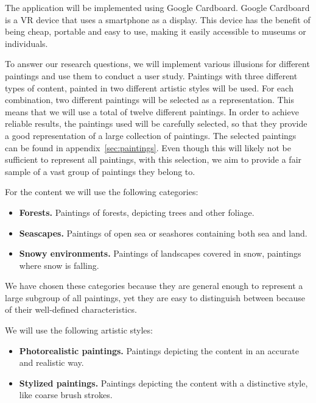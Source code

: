 \documentclass[a4paper]{article}
\begin{document}
The application will be implemented using Google Cardboard. Google Cardboard is a VR device that uses a smartphone as a display. This device has the benefit of being cheap, portable and easy to use, making it easily accessible to museums or individuals.

To answer our research questions, we will implement various illusions for different paintings and use them to conduct a user study. Paintings with three different types of content, painted in two different artistic styles will be used. For each combination, two different paintings will be selected as a representation. This means that we will use a total of twelve different paintings. In order to achieve reliable results, the paintings used will be carefully selected, so that they provide a good representation of a large collection of paintings. The selected paintings can be found in appendix~\ref{sec:paintings}. Even though this will likely not be sufficient to represent all paintings, with this selection, we aim to provide a fair sample of a vast group of paintings they belong to.

For the content we will use the following categories:

\begin{itemize}
\item \textbf{Forests.} Paintings of forests, depicting trees and other foliage.
\item \textbf{Seascapes.} Paintings of open sea or seashores containing both sea and land.
\item \textbf{Snowy environments.} Paintings of landscapes covered in snow, paintings where snow is falling.
\end{itemize}

We have chosen these categories because they are general enough to represent a large subgroup of all paintings, yet they are easy to distinguish between because of their well-defined characteristics.

We will use the following artistic styles:

\begin{itemize}
\item \textbf{Photorealistic paintings.} Paintings depicting the content in an accurate and realistic way.
\item \textbf{Stylized paintings.} Paintings depicting the content with a distinctive style, like coarse brush strokes.
\end{itemize}
\end{document}
